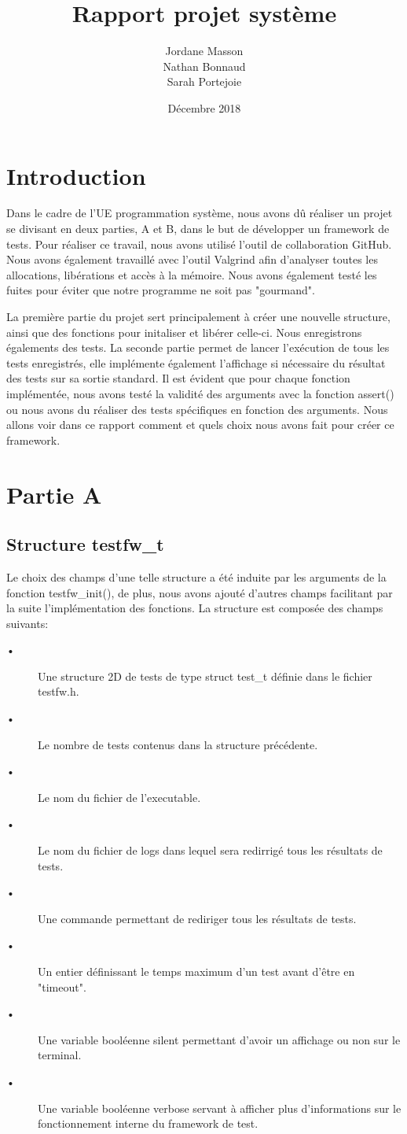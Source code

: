 \documentclass{article}
\title{Rapport projet système}
\author{Jordane Masson \\ Nathan Bonnaud \\ Sarah Portejoie}
\date{Décembre 2018}
\begin{document}
\maketitle

\section{Introduction}
Dans le cadre de l'UE programmation système, nous avons dû réaliser un projet se divisant en deux parties, A et B, dans le but de développer un framework de tests. Pour réaliser ce travail, nous avons utilisé l'outil de collaboration GitHub. Nous avons également travaillé avec l'outil Valgrind afin d'analyser toutes les allocations, libérations et accès à la mémoire. Nous avons également testé les fuites pour éviter que notre programme ne soit pas "gourmand".


	La première partie du projet sert principalement à créer une nouvelle structure, ainsi que des fonctions pour initaliser et libérer celle-ci. Nous enregistrons égalements des tests. La seconde partie permet de lancer l'exécution de tous les tests enregistrés, elle implémente également l'affichage si nécessaire du résultat des tests sur sa sortie standard.  Il est évident que pour chaque fonction implémentée, nous avons testé la validité des arguments avec la fonction assert() ou nous avons du réaliser des tests spécifiques en fonction des arguments.
Nous allons voir dans ce rapport comment et quels choix nous avons fait pour créer ce framework.
    
   
\section{Partie A}   
\subsection{Structure testfw\_t}
Le choix des champs d'une telle structure a été induite par les arguments de la fonction testfw\_init(), de plus, 
 nous avons ajouté d'autres champs facilitant par la suite l'implémentation des fonctions. La structure est composée des champs suivants:
 \begin{description}
 \item[•] Une structure 2D de tests de type struct test\_t définie dans le fichier testfw.h. 
 \item[•] Le nombre de tests contenus dans la structure précédente.
 \item[•] Le nom du fichier de l'executable. 
 \item[•] Le nom du fichier de logs dans lequel sera redirrigé tous les résultats de tests.
 \item[•] Une commande  permettant de rediriger tous les résultats de tests.
 \item[•] Un entier définissant le temps maximum d'un test avant d'être en "timeout".
 \item[•] Une variable booléenne silent permettant d'avoir un affichage ou non sur le terminal. 
 \item[•] Une variable booléenne verbose servant à afficher plus d'informations sur le fonctionnement interne du framework de test.
\end{description}
\end{document}
